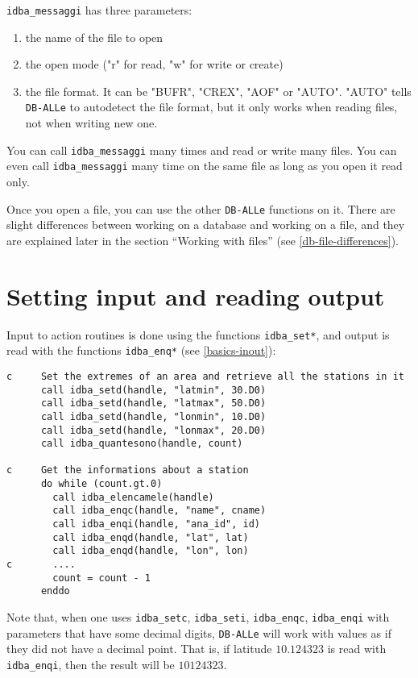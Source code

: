 \documentclass[final,12pt,a4paper,twoside]{book}
\newcommand{\dballe}{{\tt DB-ALLe}}
\begin{document}
\label{fun-idba_messaggi}

{\tt idba\_messaggi} has three parameters:

\begin{enumerate}
\item the name of the file to open
\item the open mode ("r" for read, "w" for write or create)
\item the file format.  It can be "BUFR", "CREX", "AOF" or "AUTO".  "AUTO"
      tells \dballe{} to autodetect the file format, but it only works when
      reading files, not when writing new one.
\end{enumerate}

You can call {\tt idba\_messaggi} many times and read or write many files.  You
can even call {\tt idba\_messaggi} many time on the same file as long as you
open it read only.

Once you open a file, you can use the other \dballe{} functions on it.  There
are slight differences between working on a database and working on a file, and
they are explained later in the section ``Working with files'' (see \ref{db-file-differences}).


\section{Setting input and reading output}

Input to action routines is done using the functions {\tt idba\_set*}, and output
is read with the functions {\tt idba\_enq*} (see \ref{basics-inout}):

\begin{verbatim}
c     Set the extremes of an area and retrieve all the stations in it
      call idba_setd(handle, "latmin", 30.D0)
      call idba_setd(handle, "latmax", 50.D0)
      call idba_setd(handle, "lonmin", 10.D0)
      call idba_setd(handle, "lonmax", 20.D0)
      call idba_quantesono(handle, count)
   
c     Get the informations about a station
      do while (count.gt.0)
        call idba_elencamele(handle)
        call idba_enqc(handle, "name", cname)
        call idba_enqi(handle, "ana_id", id)
        call idba_enqd(handle, "lat", lat)
        call idba_enqd(handle, "lon", lon)
c       ....
        count = count - 1
      enddo
\end{verbatim}

Note that, when one uses {\tt idba\_setc}, {\tt idba\_seti}, {\tt idba\_enqc},
{\tt idba\_enqi} with parameters that have some decimal digits, \dballe{} will
work with values as if they did not have a decimal point.  That is, if latitude
$10.124323$ is read with {\tt idba\_enqi}, then the result will be $10124323$.
\end{document}
